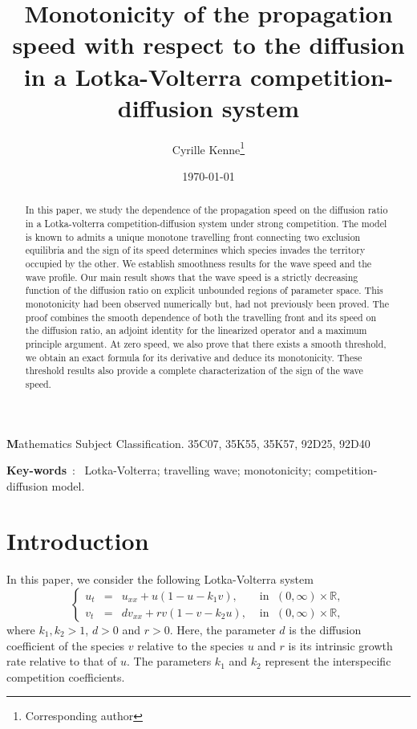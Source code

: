 \documentclass[11pt]{article}
\title{Monotonicity of the propagation speed with respect to the diffusion in a Lotka-Volterra competition-diffusion system }
\author[]{Cyrille Kenne\thanks{Corresponding author}}
\affil[]{\footnotesize Department of Mathematics, University of British Columbia, Vancouver, BC V6T 1Z2, Canada}
\date{\today}
\numberwithin{equation}{section}
\newcommand{\1}{\mathbbm{1}}
\numberwithin{equation}{section}
\theoremstyle{definition}
\def \R {\mathbb{R}}
\numberwithin{equation}{section}
\begin{document}
\maketitle
{}

\begin{abstract}
In this paper, we study the dependence of the propagation speed on the diffusion ratio in a Lotka-volterra competition-diffusion system under strong competition.  The model is known to admits a unique monotone travelling front connecting two exclusion equilibria and the sign of its speed determines which species invades the territory occupied by the other.  We establish smoothness results for the wave speed and the wave profile. Our main result shows that the wave speed is a strictly decreasing function of the diffusion ratio on explicit unbounded  regions of parameter space. This monotonicity had been observed numerically but, had not previously been proved. The proof combines the smooth dependence of both the travelling front and its speed on the diffusion ratio, an adjoint identity for the linearized operator and a maximum principle argument. At zero speed, we also prove that there exists a smooth threshold, we obtain an exact formula for its derivative and deduce its monotonicity. These threshold results also provide a complete characterization of the sign of the wave speed.
\end{abstract}

\textbf Mathematics Subject Classification. {35C07, 35K55,	35K57, 92D25, 92D40 }\par
\noindent
{\textbf {Key-words}}~:~  Lotka-Volterra; travelling wave; monotonicity; competition-diffusion model.

\section{Introduction}
In this paper, we  consider the following Lotka-Volterra system  
\begin{equation}\label{model}
\left\{ 
\begin{array}{llllll}
	u_t&=&u_{xx}+u(1-u-k_1v), & \text{ in } \; (0,\infty)\times \R,\\
	v_t&=&dv_{xx}+rv(1-v-k_2u),& \text{ in } \; (0,\infty)\times \R,
\end{array} 
\right.
\end{equation}
 where $k_1,k_2>1$, $d>0$ and $r>0$. Here, the parameter $d$ is the diffusion coefficient of the species $v$ relative to the species $u$ and $r$ is its intrinsic growth rate relative to that of $u$. The parameters $k_1$ and $k_2$ represent the interspecific competition coefficients.
 
\end{document}
